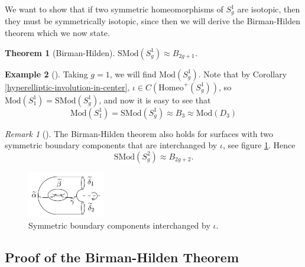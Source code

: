\documentclass[reqno]{amsart}
\newtheorem{theorem}{Theorem}[section]
\theoremstyle{definition}
\newtheorem{example}[theorem]{Example}
\theoremstyle{remark}
\newtheorem*{remark}{Remark}
\newcommand{\Mod}{{\mathrm{Mod}}}
\newcommand{\SMod}{{\mathrm{SMod}}}
\newcommand{\Homeo}{{\mathrm{Homeo}}}
\begin{document}
   We want to show that
   if two symmetric homeomorphisms of $S_{g}^{1}$ are
   isotopic, then they must be symmetrically isotopic, since then
   we will derive the Birman-Hilden theorem which we now state.
 


   \begin{theorem}[Birman-Hilden]
       $\SMod \left( S_g^{1} \right) \approx
       B_{2g+1}$.
   \end{theorem}


   \begin{example}[]
       Taking $g=1$, we will find
       $\Mod \left( S_g^{1} \right) $.
       Note that by Corollary
       \ref{hyperelliptic-involution-in-center},
       $\iota \in C\left( 
       \Homeo^{+}\left( S_g^{1} \right)  \right)  $, so
       $\Mod \left( S_1^{1} \right) =
       \SMod\left( S_g^{1} \right) $, and now it is
       easy to see that
       \[
       \Mod \left( S_1^{1} \right) = \SMod \left( S_g^{1} \right) 
       \approx B_{3} \approx \Mod \left( D_3 \right) 
       \] 
   \end{example}

   \begin{remark}[]
       The Birman-Hilden theorem also holds for
       surfaces with two symmetric boundary
       components that are interchanged by
       $\iota$, see figure
       \ref{fig:-Birman-Hilden-two-symmetric-boundary-components-png}.
       Hence
       \[
       \SMod \left( S_g^{2} \right) 
       \approx B_{2g+2}.
       \] 

        \begin{figure}[htpb]
           \centering
           \includegraphics[width=0.3\textwidth]{
           Birman-Hilden-two-symmetric-boundary-components.png}
           \caption{Symmetric boundary components
           interchanged by $\iota$.}
           \label{fig:-Birman-Hilden-two-symmetric-boundary-components-png}
       \end{figure}
   \end{remark}





   \subsection{Proof of the Birman-Hilden Theorem}
\end{document}
